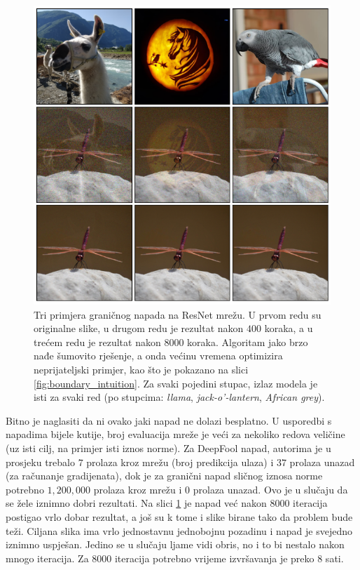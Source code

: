 \documentclass[utf8, diplomski]{fer}
\begin{document}
\begin{figure}[H]
\centering
\includegraphics[width=1.0\textwidth,keepaspectratio]{img/results/boundary_triple.png}
\caption{Tri primjera graničnog napada na ResNet mrežu. U prvom redu su originalne slike, u drugom redu je rezultat nakon $400$ koraka, a u trećem redu je rezultat nakon $8000$ koraka. Algoritam jako brzo nađe šumovito rješenje, a onda većinu vremena optimizira neprijateljski primjer, kao što je pokazano na slici \ref{fig:boundary_intuition}. Za svaki pojedini stupac, izlaz modela je isti za svaki red (po stupcima: \textit{llama}, \textit{jack-o'-lantern}, \textit{African grey}).}
\label{fig:boundary_triple}
\end{figure}

Bitno je naglasiti da ni ovako jaki napad ne dolazi besplatno. U usporedbi s napadima bijele kutije, broj evaluacija mreže je veći za nekoliko redova veličine (uz isti cilj, na primjer isti iznos norme). Za DeepFool napad, autorima je u prosjeku trebalo $7$ prolaza kroz mrežu (broj predikcija ulaza) i $37$ prolaza unazad (za računanje gradijenata), dok je za granični napad sličnog iznosa norme potrebno $1,200,000$ prolaza kroz mrežu i $0$ prolaza unazad. Ovo je u slučaju da se žele iznimno dobri rezultati. Na slici \ref{fig:boundary_triple} je napad već nakon $8000$ iteracija postigao vrlo dobar rezultat, a još su k tome i slike birane tako da problem bude teži. Ciljana slika ima vrlo jednostavnu jednobojnu pozadinu i napad je svejedno iznimno uspješan. Jedino se u slučaju ljame vidi obris, no i to bi nestalo nakon mnogo iteracija. Za $8000$ iteracija potrebno vrijeme izvršavanja je preko $8$ sati.
\end{document}
